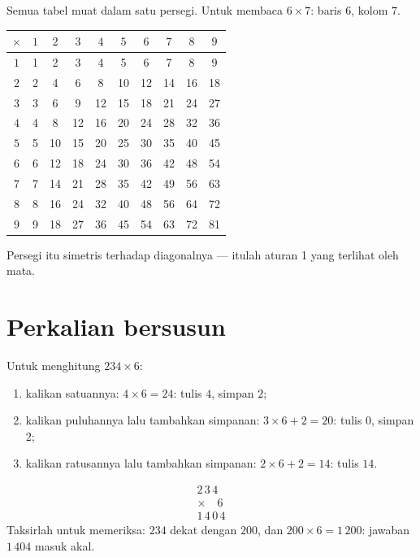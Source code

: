 \begin{example}\label{ex:g3:mult:table}
Semua tabel muat dalam satu persegi. Untuk membaca $6 \times 7$:
baris $6$, kolom $7$.
\begin{center}
\renewcommand{\arraystretch}{1.15}
\begin{tabular}{c|ccccccccc}
$\times$ & $1$ & $2$ & $3$ & $4$ & $5$ & $6$ & $7$ & $8$ & $9$ \\
\hline
$1$ & 1 & 2 & 3 & 4 & 5 & 6 & 7 & 8 & 9 \\
$2$ & 2 & 4 & 6 & 8 & 10 & 12 & 14 & 16 & 18 \\
$3$ & 3 & 6 & 9 & 12 & 15 & 18 & 21 & 24 & 27 \\
$4$ & 4 & 8 & 12 & 16 & 20 & 24 & 28 & 32 & 36 \\
$5$ & 5 & 10 & 15 & 20 & 25 & 30 & 35 & 40 & 45 \\
$6$ & 6 & 12 & 18 & 24 & 30 & 36 & 42 & 48 & 54 \\
$7$ & 7 & 14 & 21 & 28 & 35 & 42 & 49 & 56 & 63 \\
$8$ & 8 & 16 & 24 & 32 & 40 & 48 & 56 & 64 & 72 \\
$9$ & 9 & 18 & 27 & 36 & 45 & 54 & 63 & 72 & 81 \\
\end{tabular}
\end{center}
Persegi itu simetris terhadap diagonalnya --- itulah aturan 1 yang
terlihat oleh mata.
\end{example}

\section{Perkalian bersusun}

\begin{method}\label{met:g3:mult:column}
Untuk menghitung $234 \times 6$:
\begin{enumerate}
  \item kalikan satuannya: $4 \times 6 = 24$: tulis $4$, simpan $2$;
  \item kalikan puluhannya lalu tambahkan simpanan:
        $3 \times 6 + 2 = 20$: tulis $0$, simpan $2$;
  \item kalikan ratusannya lalu tambahkan simpanan:
        $2 \times 6 + 2 = 14$: tulis $14$.
\end{enumerate}
\[
\begin{array}{r}
2\,3\,4 \\
\times \quad 6 \\
\hline
1\,4\,0\,4
\end{array}
\]
Taksirlah untuk memeriksa: $234$ dekat dengan $200$, dan
$200 \times 6 = 1\,200$: jawaban $1\,404$ masuk akal.
\end{method}

